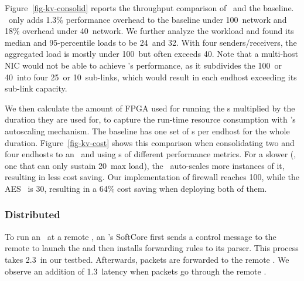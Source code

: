 Figure~\ref{fig-kv-consolid} reports the throughput comparison of \snic\ and the baseline.
\snic\ only adds 1.3\% performance overhead to the baseline under 100\Gbps\ network and 18\% overhead under 40\Gbps\ network. 
We further analyze the workload and found its median and 95-percentile loads to be 24\Gbps\ and 32\Gbps.
With four senders/receivers, the aggregated load is mostly under 100\Gbps\ but often exceeds 40\Gbps.
Note that a multi-host NIC would not be able to achieve \snic's performance, as it subdivides the 100\Gbps\ or 40\Gbps\ into four 25\Gbps\ or 10\Gbps\ sub-links, which would result in each endhost exceeding its sub-link capacity.


We then calculate the amount of FPGA used for running the \nt{}s multiplied by the duration they are used for, to capture the run-time resource consumption with \snic's autoscaling mechanism. The baseline has one set of \nt{}s per endhost for the whole duration.
Figure~\ref{fig-kv-cost} shows this comparison when consolidating two and four endhosts to an \snic\ and using \nt{}s of different performance metrics.
For a slower \nt{} (\eg, one that can only sustain 20\Gbps\ max load), the \snic\ auto-scales more instances of it, resulting in less cost saving.
Our implementation of firewall \nt{} reaches 100\Gbps, while the AES \nt\ is 30\Gbps, resulting in a 64\% cost saving when deploying both of them.





\subsubsection{Distributed \snic{}}
To run an \nt\ at a remote \snic,
an \snic{}'s SoftCore first sends a control message to the remote \snic{} to launch the \nt{} and then installs forwarding rules to its parser. This process takes 2.3\mus\ in our testbed.
Afterwards, packets are forwarded to the remote \snic. We observe an addition of 1.3\mus\ latency when packets go through the remote \snic. %

